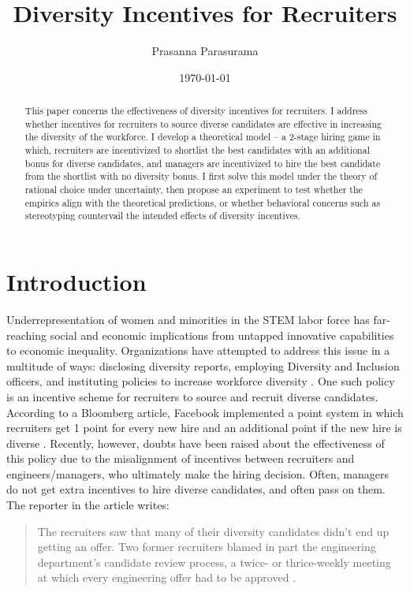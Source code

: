 \documentclass[11pt]{article}
\begin{document}
\title{Diversity Incentives for Recruiters}
\author{Prasanna Parasurama}
\date{\today}
\maketitle

\begin{abstract}
    This paper concerns the effectiveness of diversity incentives for recruiters. 
    I address whether incentives for recruiters to source diverse candidates are effective in increasing the diversity of the workforce. 
    I develop a theoretical model -- a 2-stage hiring game in which, recruiters are incentivized to shortlist the best candidates with an additional bonus for diverse candidates, and managers are incentivized to hire the best candidate from the shortlist with no diversity bonus. 
    I first solve this model under the theory of rational choice under uncertainty, then propose an experiment to test whether the empirics align with the theoretical predictions, or whether behavioral concerns such as stereotyping countervail the intended effects of diversity incentives.
\end{abstract}

\section{Introduction}
Underrepresentation of women and minorities in the STEM labor force has far-reaching social and economic implications from untapped innovative capabilities to economic inequality. Organizations have attempted to address this issue in a multitude of ways: disclosing diversity reports, employing Diversity and Inclusion officers, and instituting policies to increase workforce diversity \parencite{shi_adoption_2018}. One such policy is an incentive scheme for recruiters to source and recruit diverse candidates. According to a Bloomberg article, Facebook implemented a point system in which recruiters get 1 point for every new hire and an additional point if the new hire is diverse \parencite{huet_facebooks_2017}. Recently, however, doubts have been raised about the effectiveness of this policy due to the misalignment of incentives between recruiters and engineers/managers, who ultimately make the hiring decision. Often, managers do not get extra incentives to hire diverse candidates, and often pass on them. The reporter in the article writes:
\begin{quote}
    The recruiters saw that many of their diversity candidates didn’t end up getting an offer. Two former recruiters blamed in part the engineering department’s candidate review process, a twice- or thrice-weekly meeting at which every engineering offer had to be approved \parencite{huet_facebooks_2017}.
\end{quote}
\end{document}
